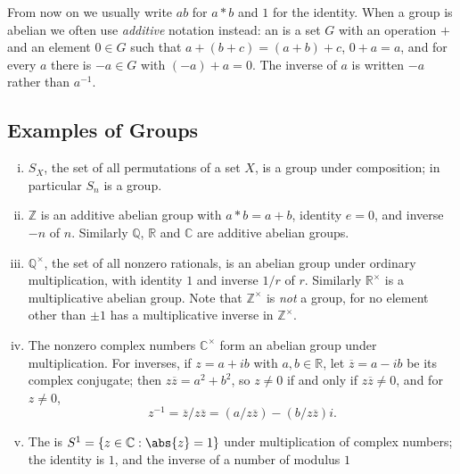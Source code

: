\begin{notation}
	From now on we usually write \(ab\) for \(a*b\) and \(1\) for the identity. When a
	group is abelian we often use \emph{additive} notation instead: an  is a set \(G\) with an operation \(+\) and an element \(0 \in G\) such that
	\(a + (b+c) = (a+b)+c\), \(0 + a = a\), and for every \(a\) there is \(-a \in G\) with
	\((-a) + a = 0\). The inverse of \(a\) is written \(-a\) rather than \(a^{-1}\).
\end{notation}

\subsection{Examples of Groups}

\begin{eg}\label{eg:group-list}
	\begin{enumerate}[(i)]
		\item \(S_X\), the set of all permutations of a set \(X\), is a group under
		      composition; in particular \(S_n\) is a group.
		\item \(\mathbb{Z}\) is an additive abelian group with \(a*b = a+b\), identity
		      \(e = 0\), and inverse \(-n\) of \(n\). Similarly \(\mathbb{Q}\),
		      \(\mathbb{R}\) and \(\mathbb{C}\) are additive abelian groups.
		\item \(\mathbb{Q}^\times\), the set of all nonzero rationals, is an abelian group
		      under ordinary multiplication, with identity \(1\) and inverse \(1/r\) of
		      \(r\). Similarly \(\mathbb{R}^\times\) is a multiplicative abelian group.
		      Note that \(\mathbb{Z}^\times\) is \emph{not} a group, for no element other
		      than \(\pm 1\) has a multiplicative inverse in \(\mathbb{Z}^\times\).
		\item The nonzero complex numbers \(\mathbb{C}^\times\) form an abelian group under
		      multiplication. For inverses, if \(z = a + ib\) with \(a, b \in \mathbb{R}\),
		      let \(\overline{z} = a - ib\) be its complex conjugate; then
		      \(z\overline{z} = a^2 + b^2\), so \(z \neq 0\) if and only if
		      \(z\overline{z} \neq 0\), and for \(z \neq 0\),
		      \[
			      z^{-1} = \overline{z}/z\overline{z} = (a/z\overline{z}) - (b/z\overline{z})i.
		      \]
		\item The  is
		      \(S^1 = \{z \in \mathbb{C} : \abs{z} = 1\}\) under multiplication of complex
		      numbers; the identity is \(1\), and the inverse of a number of modulus \(1\)

\end{enumerate}
\end{eg}
